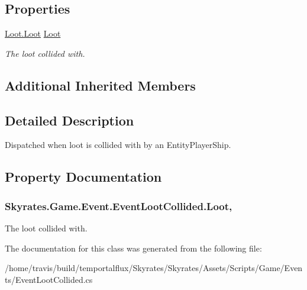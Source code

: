 \subsection*{Properties}
\begin{DoxyCompactItemize}
\item 
\hyperlink{class_skyrates_1_1_loot_1_1_loot}{Loot.\-Loot} \hyperlink{class_skyrates_1_1_game_1_1_event_1_1_event_loot_collided_a28d55a80e46675c1695bf8462e9949dd}{Loot}
\begin{DoxyCompactList}\small\item\em The loot collided with. \end{DoxyCompactList}\end{DoxyCompactItemize}
\subsection*{Additional Inherited Members}


\subsection{Detailed Description}
Dispatched when loot is collided with by an Entity\-Player\-Ship. 



\subsection{Property Documentation}
\hypertarget{class_skyrates_1_1_game_1_1_event_1_1_event_loot_collided_a28d55a80e46675c1695bf8462e9949dd}{
\subsubsection[{Loot}]{ Skyrates.\-Game.\-Event.\-Event\-Loot\-Collided.\-Loot\hspace{0.3cm}{\ttfamily [get]}, {\ttfamily [set]}}}\label{class_skyrates_1_1_game_1_1_event_1_1_event_loot_collided_a28d55a80e46675c1695bf8462e9949dd}


The loot collided with. 



The documentation for this class was generated from the following file\-:\begin{DoxyCompactItemize}
\item 
/home/travis/build/temportalflux/\-Skyrates/\-Skyrates/\-Assets/\-Scripts/\-Game/\-Events/Event\-Loot\-Collided.\-cs\end{DoxyCompactItemize}
